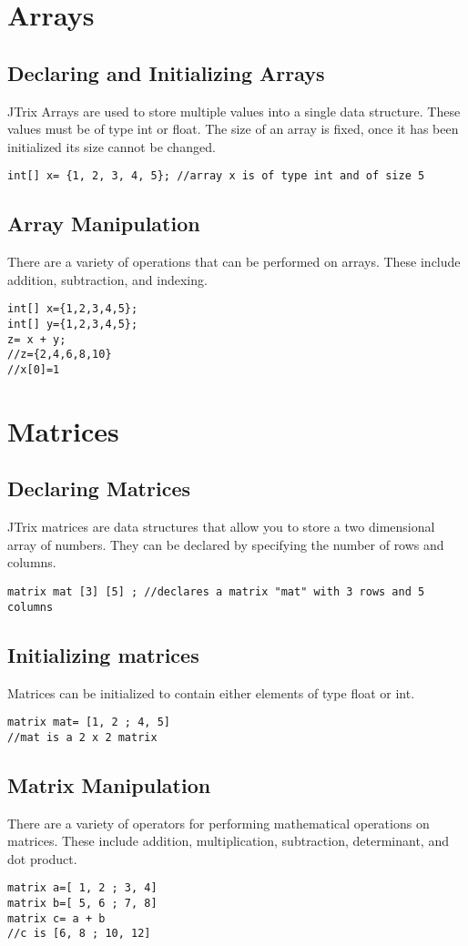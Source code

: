 \documentclass[12pt]{report}
\begin{document}
\section{Arrays}
\subsection{Declaring and Initializing Arrays}
JTrix Arrays are used to store multiple values into a single data structure. These values must be of type int or float. The size of an array is fixed, once it has been initialized its size cannot be changed. 
\begin{lstlisting}
int[] x= {1, 2, 3, 4, 5}; //array x is of type int and of size 5
\end{lstlisting}
\subsection{Array Manipulation}
There are a variety of operations that can be performed on arrays. These include addition, subtraction, and indexing. 
\begin{lstlisting}
int[] x={1,2,3,4,5};
int[] y={1,2,3,4,5};
z= x + y; 
//z={2,4,6,8,10}
//x[0]=1
\end{lstlisting}
\section{Matrices}
\subsection{Declaring Matrices}
JTrix matrices are data structures that allow you to store a two dimensional array of numbers. They can be declared by specifying the number of rows and columns. 
\begin{lstlisting}
matrix mat [3] [5] ; //declares a matrix "mat" with 3 rows and 5 columns 
\end{lstlisting}
\subsection{Initializing matrices}
Matrices can be initialized to contain either elements of type float or int. 
\begin{lstlisting}
matrix mat= [1, 2 ; 4, 5] 
//mat is a 2 x 2 matrix 
\end{lstlisting}
\subsection{Matrix Manipulation}
There are a variety of operators for performing mathematical operations on matrices. These include addition, multiplication, 
subtraction, determinant, and dot product. 
\begin{lstlisting}
matrix a=[ 1, 2 ; 3, 4]
matrix b=[ 5, 6 ; 7, 8]
matrix c= a + b
//c is [6, 8 ; 10, 12]
\end{lstlisting}
\end{document}
